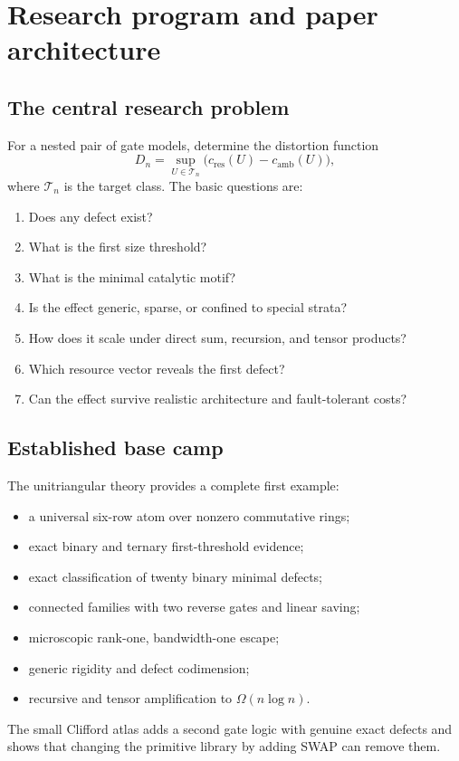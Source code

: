\section{Research program and paper architecture}\label{g:ch:program}


\subsection{The central research problem}
For a nested pair of gate models, determine the distortion function
\[
D_n=
\sup_{U\in\mathcal T_n}
\bigl(c_{\mathrm{res}}(U)-c_{\mathrm{amb}}(U)\bigr),
\]
where $\mathcal T_n$ is the target class.  The basic questions are:
\begin{enumerate}
\item Does any defect exist?
\item What is the first size threshold?
\item What is the minimal catalytic motif?
\item Is the effect generic, sparse, or confined to special strata?
\item How does it scale under direct sum, recursion, and tensor products?
\item Which resource vector reveals the first defect?
\item Can the effect survive realistic architecture and fault-tolerant costs?
\end{enumerate}

\subsection{Established base camp}
The unitriangular theory provides a complete first example:
\begin{itemize}
\item a universal six-row atom over nonzero commutative rings;
\item exact binary and ternary first-threshold evidence;
\item exact classification of twenty binary minimal defects;
\item connected families with two reverse gates and linear saving;
\item microscopic rank-one, bandwidth-one escape;
\item generic rigidity and defect codimension;
\item recursive and tensor amplification to $\Omega(n\log n)$.
\end{itemize}
The small Clifford atlas adds a second gate logic with genuine exact defects and shows that changing the primitive library by adding SWAP can remove them.

